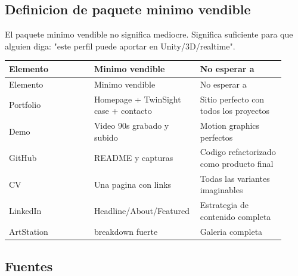 \subsection{Definicion de paquete minimo vendible}


El paquete minimo vendible no significa mediocre. Significa suficiente para que alguien diga: "este perfil puede aportar en Unity/3D/realtime".


\begin{center}
\scriptsize
\begin{longtable}{>{\raggedright\arraybackslash}p{0.305\linewidth} >{\raggedright\arraybackslash}p{0.305\linewidth} >{\raggedright\arraybackslash}p{0.305\linewidth}}
\toprule
Elemento & Minimo vendible & No esperar a \\
\midrule
\endfirsthead
\toprule
Elemento & Minimo vendible & No esperar a \\
\midrule
\endhead
Portfolio & Homepage + TwinSight case + contacto & Sitio perfecto con todos los proyectos \\
Demo & Video 90s grabado y subido & Motion graphics perfectos \\
GitHub & README y capturas & Codigo refactorizado como producto final \\
CV & Una pagina con links & Todas las variantes imaginables \\
LinkedIn & Headline/About/Featured & Estrategia de contenido completa \\
ArtStation & 1 breakdown fuerte & Galeria completa \\
\bottomrule
\end{longtable}
\end{center}



\subsection{Fuentes}


